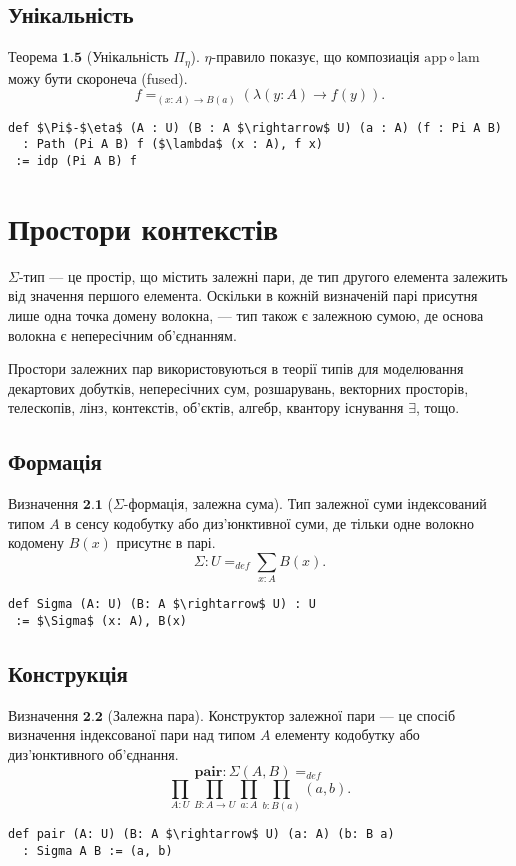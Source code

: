 \documentclass{article}
\theoremstyle{definition}
\begin{document}
\subsection{Унікальність}

$\textbf{Теорема\ 1.5}$ (Унікальність $\Pi_\eta$).
$\eta$-правило показує, що композиація $\mathrm{app} \circ \mathrm{lam}$ можу бути скоронеча (fused).
$$
    f =_{(x:A)\rightarrow B(a)} (\lambda (y:A) \rightarrow f(y)).
$$
\begin{lstlisting}[mathescape=true]
def $\Pi$-$\eta$ (A : U) (B : A $\rightarrow$ U) (a : A) (f : Pi A B)
  : Path (Pi A B) f ($\lambda$ (x : A), f x)
 := idp (Pi A B) f
\end{lstlisting}

\newpage
\section{Простори контекстів}

$\Sigma$-тип --- це простір, що містить залежні пари, де тип другого
елемента залежить від значення першого елемента. Оскільки в кожній
визначеній парі присутня лише одна точка домену волокна, — тип також
є залежною сумою, де основа волокна є непересічним об'єднанням.

Простори залежних пар використовуються в теорії типів для моделювання
декартових добутків, непересічних сум, розшарувань, векторних просторів,
телескопів, лінз, контекстів, об'єктів, алгебр, квантору існування $\exists$, тощо.

\subsection{Формація}

$\textbf{Визначення\ 2.1}$ ($\Sigma$-формація, залежна сума). Тип залежної суми
індексований типом  $A$ в сенсу кодобутку або диз'юнктивної суми, де тільки одне
волокно кодомену $B(x)$ присутнє в парі.
$$
     \Sigma : U =_{def} \sum_{x:A} B(x).
$$
\begin{lstlisting}[mathescape=true]
def Sigma (A: U) (B: A $\rightarrow$ U) : U
 := $\Sigma$ (x: A), B(x)
\end{lstlisting}

\subsection{Конструкція}

$\textbf{Визначення\ 2.2}$ (Залежна пара). Конструктор залежної пари —
це спосіб визначення індексованої пари над типом $A$ елементу кодобутку
або диз'юнктивного об'єднання.
$$
      \mathbf{pair} : \Sigma(A,B) =_{def}
$$
$$
      \prod_{A:U}\prod_{B:A \rightarrow U}\prod_{a:A}\prod_{b:B(a)} (a,b).
$$
\begin{lstlisting}[mathescape=true]
def pair (A: U) (B: A $\rightarrow$ U) (a: A) (b: B a)
  : Sigma A B := (a, b)
\end{lstlisting}
\end{document}
